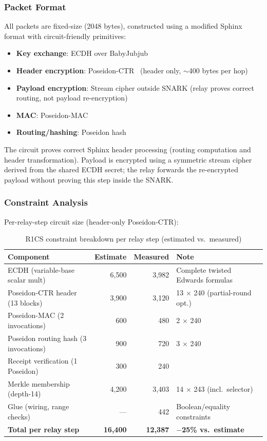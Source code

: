 \documentclass[11pt,a4paper]{article}
\begin{document}
\subsubsection{Packet Format}

All packets are fixed-size (2048 bytes), constructed using a modified Sphinx~\cite{sphinx} format with circuit-friendly primitives:

\begin{itemize}[nosep]
    \item \textbf{Key exchange}: ECDH over BabyJubjub
    \item \textbf{Header encryption}: Poseidon-CTR~\cite{poseidon} (header only, $\sim$400 bytes per hop)
    \item \textbf{Payload encryption}: Stream cipher outside SNARK (relay proves correct routing, not payload re-encryption)
    \item \textbf{MAC}: Poseidon-MAC
    \item \textbf{Routing/hashing}: Poseidon hash
\end{itemize}

The circuit proves correct Sphinx header processing (routing computation and header transformation). Payload is encrypted using a symmetric stream cipher derived from the shared ECDH secret; the relay forwards the re-encrypted payload without proving this step inside the SNARK.

\subsubsection{Constraint Analysis}
\label{sec:constraints}

Per-relay-step circuit size (header-only Poseidon-CTR):

\begin{table}[h]
\centering
\caption{R1CS constraint breakdown per relay step (estimated vs.\ measured)}
\begin{tabular}{@{}lrrl@{}}
\toprule
Component & Estimate & Measured & Note \\
\midrule
ECDH (variable-base scalar mult) & 6,500 & 3,982 & Complete twisted Edwards formulas \\
Poseidon-CTR header (13 blocks) & 3,900 & 3,120 & 13 $\times$ 240 (partial-round opt.) \\
Poseidon-MAC (2 invocations) & 600 & 480 & 2 $\times$ 240 \\
Poseidon routing hash (3 invocations) & 900 & 720 & 3 $\times$ 240 \\
Receipt verification (1 Poseidon) & 300 & 240 & \\
Merkle membership (depth-14) & 4,200 & 3,403 & 14 $\times$ 243 (incl.\ selector) \\
Glue (wiring, range checks) & --- & 442 & Boolean/equality constraints \\
\midrule
\textbf{Total per relay step} & \textbf{16,400} & \textbf{12,387} & \textbf{$-$25\% vs.\ estimate} \\
\bottomrule
\end{tabular}
\label{tab:constraints}
\end{table}
\end{document}
